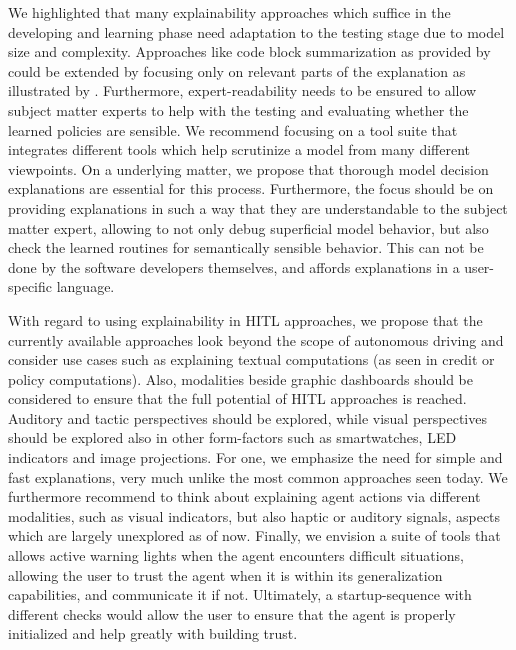 \documentclass[twoside,11pt]{article}
\begin{document}

We highlighted that many explainability approaches which suffice in the developing and learning phase need adaptation to the testing stage due to model size and complexity. Approaches like code block summarization as provided by \citet{VermaEtAl:2018:ProgrammaticallyInterpretableRL} could be extended by focusing only on relevant parts of the explanation as illustrated by \citet{Vu:2020:PGMExplainer}. Furthermore, expert-readability needs to be ensured to allow subject matter experts to help with the testing and evaluating whether the learned policies are sensible.
We recommend focusing on a tool suite that integrates different tools which help scrutinize a model from many different viewpoints. On a underlying matter, we propose that thorough model decision explanations are essential for this process. Furthermore, the focus should be on providing explanations in such a way that they are understandable to the subject matter expert, allowing to not only debug superficial model behavior, but also check the learned routines for semantically sensible behavior. This can not be done by the software developers themselves, and affords explanations in a user-specific language.


With regard to using explainability in HITL approaches, we propose that the currently available approaches look beyond the scope of autonomous driving and consider use cases such as explaining textual computations (as seen in credit or policy computations). Also, modalities beside graphic dashboards should be considered to ensure that the full potential of HITL approaches is reached. Auditory and tactic perspectives should be explored, while visual perspectives should be explored also in other form-factors such as smartwatches, LED indicators and image projections.
For one, we emphasize the need for simple and fast explanations, very much unlike the most common approaches seen today. We furthermore recommend to think about explaining agent actions via different modalities, such as visual indicators, but also haptic or auditory signals, aspects which are largely unexplored as of now. Finally, we envision a suite of tools that allows active warning lights when the agent encounters difficult situations, allowing the user to trust the agent when it is within its generalization capabilities, and communicate it if not. Ultimately, a startup-sequence with different checks would allow the user to ensure that the agent is properly initialized and help greatly with building trust.
\end{document}
